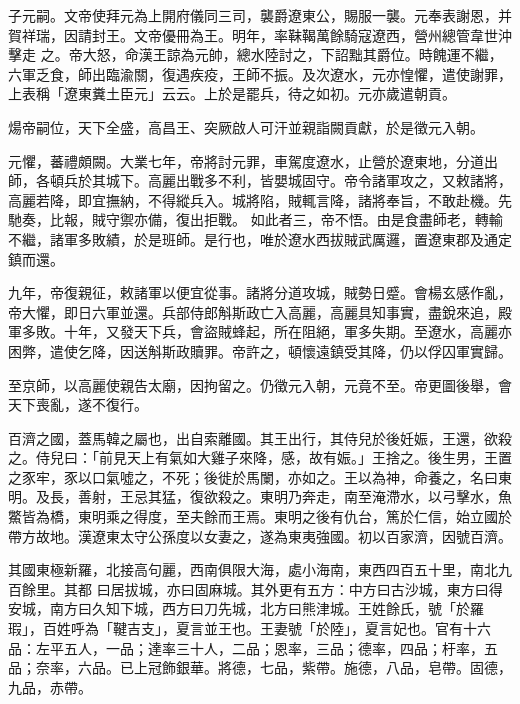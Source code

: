 \begin{pinyinscope}
 子元嗣。文帝使拜元為上開府儀同三司，襲爵遼東公，賜服一襲。元奉表謝恩，并賀祥瑞，因請封王。文帝優冊為王。明年，率靺鞨萬餘騎寇遼西，營州總管韋世沖擊走
 之。帝大怒，命漢王諒為元帥，總水陸討之，下詔黜其爵位。時餽運不繼，六軍乏食，師出臨渝關，復遇疾疫，王師不振。及次遼水，元亦惶懼，遣使謝罪，上表稱「遼東糞土臣元」云云。上於是罷兵，待之如初。元亦歲遣朝貢。



 煬帝嗣位，天下全盛，高昌王、突厥啟人可汗並親詣闕貢獻，於是徵元入朝。



 元懼，蕃禮頗闕。大業七年，帝將討元罪，車駕度遼水，止營於遼東地，分道出師，各頓兵於其城下。高麗出戰多不利，皆嬰城固守。帝令諸軍攻之，又敕諸將，高麗若降，即宜撫納，不得縱兵入。城將陷，賊輒言降，諸將奉旨，不敢赴機。先馳奏，比報，賊守禦亦備，復出拒戰。
 如此者三，帝不悟。由是食盡師老，轉輸不繼，諸軍多敗績，於是班師。是行也，唯於遼水西拔賊武厲邏，置遼東郡及通定鎮而還。



 九年，帝復親征，敕諸軍以便宜從事。諸將分道攻城，賊勢日蹙。會楊玄感作亂，帝大懼，即日六軍並還。兵部侍郎斛斯政亡入高麗，高麗具知事實，盡銳來追，殿軍多敗。十年，又發天下兵，會盜賊蜂起，所在阻絕，軍多失期。至遼水，高麗亦困弊，遣使乞降，因送斛斯政贖罪。帝許之，頓懷遠鎮受其降，仍以俘囚軍實歸。



 至京師，以高麗使親告太廟，因拘留之。仍徵元入朝，元竟不至。帝更圖後舉，會天下喪亂，遂不復行。



 百濟之國，蓋馬韓之屬也，出自索離國。其王出行，其侍兒於後妊娠，王還，欲殺之。侍兒曰：「前見天上有氣如大雞子來降，感，故有娠。」王捨之。後生男，王置之豕牢，豕以口氣噓之，不死；後徙於馬闌，亦如之。王以為神，命養之，名曰東明。及長，善射，王忌其猛，復欲殺之。東明乃奔走，南至淹滯水，以弓擊水，魚鱉皆為橋，東明乘之得度，至夫餘而王焉。東明之後有仇台，篤於仁信，始立國於帶方故地。漢遼東太守公孫度以女妻之，遂為東夷強國。初以百家濟，因號百濟。



 其國東極新羅，北接高句麗，西南俱限大海，處小海南，東西四百五十里，南北九百餘里。其都
 曰居拔城，亦曰固麻城。其外更有五方：中方曰古沙城，東方曰得安城，南方曰久知下城，西方曰刀先城，北方曰熊津城。王姓餘氏，號「於羅瑕」，百姓呼為「鞬吉支」，夏言並王也。王妻號「於陸」，夏言妃也。官有十六品：左平五人，一品；達率三十人，二品；恩率，三品；德率，四品；杅率，五品；奈率，六品。已上冠飾銀華。將德，七品，紫帶。施德，八品，皂帶。固德，九品，赤帶。




\end{pinyinscope}
